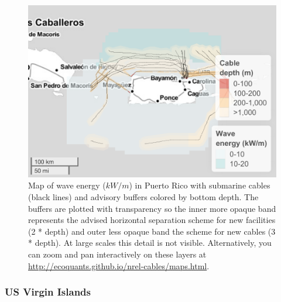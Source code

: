 \documentclass[]{article}
\begin{document}
\begin{figure}
\centering
\includegraphics{report_files/figure-latex/mapWavePuertoRico-1.pdf}
\caption{\label{fig:mapWavePuertoRico}Map of wave energy (\(kW/m\)) in
Puerto Rico with submarine cables (black lines) and advisory buffers
colored by bottom depth. The buffers are plotted with transparency so
the inner more opaque band represents the advised horizontal separation
scheme for new facilities (2 * depth) and outer less opaque band the
scheme for new cables (3 * depth). At large scales this detail is not
visible. Alternatively, you can zoom and pan interactively on these
layers at \url{http://ecoquants.github.io/nrel-cables/maps.html}.}
\end{figure}

\hypertarget{us-virgin-islands-1}{%
\subsubsection{US Virgin Islands}\label{us-virgin-islands-1}}
\end{document}

